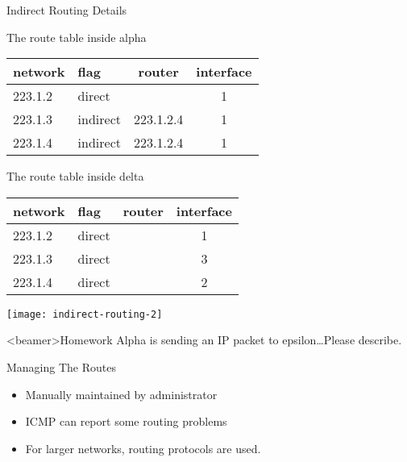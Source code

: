 \begin{frame}{Indirect Routing Details}
  \begin{minipage}{.5\linewidth}
    \begin{iblock}{The route table inside alpha}
      {\small\ttfamily
        \begin{tabular}{llcc}
          \toprule
          \textrm{network} & \textrm{flag} & \textrm{router} & \textrm{interface}\\\midrule
          223.1.2 & direct & & 1\\
          223.1.3 & indirect & 223.1.2.4 & 1\\
          223.1.4 & indirect & 223.1.2.4 & 1\\\bottomrule
        \end{tabular}}
    \end{iblock}
    \begin{iblock}{The route table inside delta}
      {\small\ttfamily
        \begin{tabular}{llcc}
          \toprule
          \textrm{network} & \textrm{flag} & \textrm{router} & \textrm{interface} \\\midrule
          223.1.2 & direct & & 1\\
          223.1.3 & direct & & 3\\
          223.1.4 & direct & & 2\\\bottomrule
        \end{tabular}}
    \end{iblock}
  \end{minipage}\hfill
  \begin{minipage}{.45\linewidth}
    \texttt{[image: indirect-routing-2]}
  \end{minipage}
\end{frame}

\begin{frame}<beamer>{Homework}
  Alpha is sending an IP packet to epsilon\ldots{}Please describe.
\end{frame}

\begin{frame}{Managing The Routes}
  \begin{itemize}
  \item Manually maintained by administrator
  \item ICMP can report some routing problems
  \item For larger networks, routing protocols are used.
  \end{itemize}
\end{frame}

